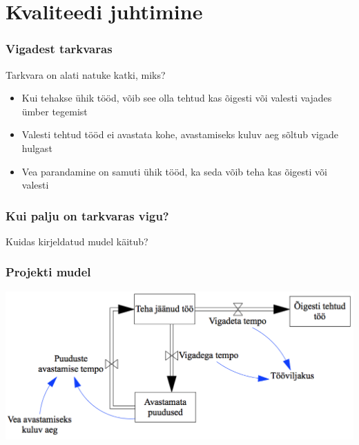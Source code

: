 \section{Kvaliteedi juhtimine}

\begin{frame}[fragile]
  \frametitle{Vigadest tarkvaras}
	Tarkvara on alati natuke katki, miks?
	\begin{itemize}
		\item Kui tehakse ühik tööd, võib see olla tehtud kas õigesti või valesti vajades ümber tegemist
		\item Valesti tehtud tööd ei avastata kohe, avastamiseks kuluv aeg sõltub vigade hulgast
		\item Vea parandamine on samuti ühik tööd, ka seda võib teha kas õigesti või valesti
	\end{itemize}
\end{frame}

\begin{frame}[fragile]
	\frametitle{Kui palju on tarkvaras vigu?}
	\vfill
	\begin{center}
		Kuidas kirjeldatud mudel käitub? 
	\end{center}
	\vfill
\end{frame}


\begin{frame}[fragile]
  \frametitle{Projekti mudel}
  	\begin{center}
			\includegraphics[width=.9\textwidth]{vead_mudel.png}
	\end{center}
\end{frame}


